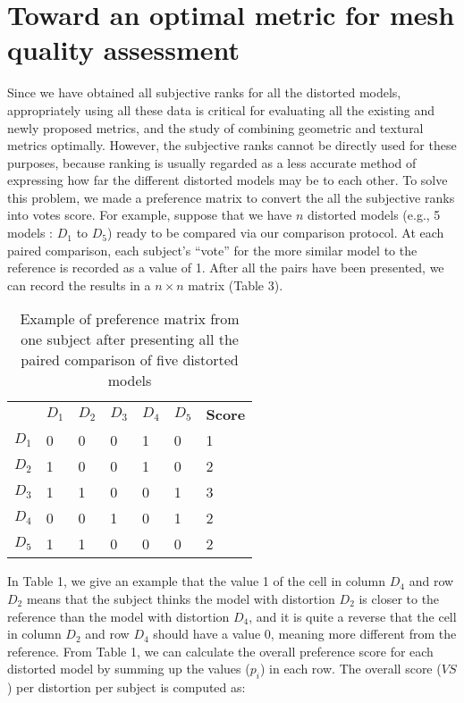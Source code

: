 \section{Toward an optimal metric for mesh quality assessment}
Since we have obtained all subjective ranks for all the distorted models, appropriately using all these data is critical for evaluating all the existing and newly proposed metrics, and the study of combining geometric and textural metrics optimally. However, the subjective ranks cannot be directly used for these purposes, because ranking is usually regarded as a less accurate method of expressing how far the different distorted models may be to each other.  To solve this problem, we made a preference matrix \cite{Ledda_2005} to convert the all the subjective ranks into votes score. For example, suppose that we have $n$ distorted models (e.g., 5 models : $D_1$ to $D_5$) ready to be compared via our comparison protocol.   At each paired comparison, each subject’s “vote” for the more similar model to the reference is recorded as a value of 1. After all the pairs have been presented, we can record the results in a $n \times n$ matrix (Table 3).
\begin{table}[]
\centering
\caption{Example of preference matrix from one subject after presenting all the paired comparison of five distorted models}
\label{my-label}
\begin{tabular}{lllllll}
            & $D_1$ & $D_2$ & $D_3$ & $D_4$ & $D_5$ & \textbf{Score} \\
$D_1$ & 0           & 0           & 0           & 1           & 0           & 1     \\
$D_2$ & 1           & 0           & 0           & 1           & 0           & 2     \\
$D_3$ & 1           & 1           & 0           & 0           & 1           & 3     \\
$D_4$ & 0           & 0           & 1           & 0           & 1           & 2     \\
$D_5$ & 1           & 1           & 0           & 0           & 0           & 2    
\end{tabular}
\end{table}
In Table 1, we give an example that the value 1 of the cell in column $D_4$ and row $D_2$ means that the subject thinks the model with distortion $D_2$ is closer to the reference than the model with distortion $D_4$, and it is quite a reverse that the cell in column $D_2$ and row $D_4$ should have a value 0, meaning more different from the reference. From Table 1, we can calculate the overall preference score for each distorted model by summing up the values ($p_i$) in each row. The overall score ($VS$) per distortion per subject is computed as: